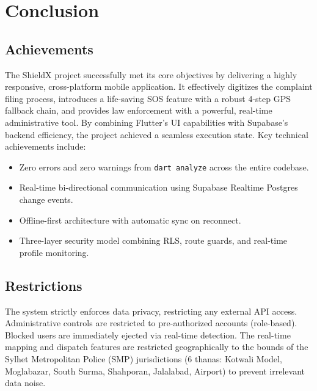 \documentclass[11pt, a4paper]{report}
\begin{document}
\chapter{Conclusion}

\section{Achievements}
The ShieldX project successfully met its core objectives by delivering a highly responsive, cross-platform mobile application. It effectively digitizes the complaint filing process, introduces a life-saving SOS feature with a robust 4-step GPS fallback chain, and provides law enforcement with a powerful, real-time administrative tool. By combining Flutter's UI capabilities with Supabase's backend efficiency, the project achieved a seamless execution state. Key technical achievements include:
\begin{itemize}
    \item Zero errors and zero warnings from \texttt{dart analyze} across the entire codebase.
    \item Real-time bi-directional communication using Supabase Realtime Postgres change events.
    \item Offline-first architecture with automatic sync on reconnect.
    \item Three-layer security model combining RLS, route guards, and real-time profile monitoring.
\end{itemize}

\section{Restrictions}
The system strictly enforces data privacy, restricting any external API access. Administrative controls are restricted to pre-authorized accounts (role-based). Blocked users are immediately ejected via real-time detection. The real-time mapping and dispatch features are restricted geographically to the bounds of the Sylhet Metropolitan Police (SMP) jurisdictions (6 thanas: Kotwali Model, Moglabazar, South Surma, Shahporan, Jalalabad, Airport) to prevent irrelevant data noise.
\end{document}

